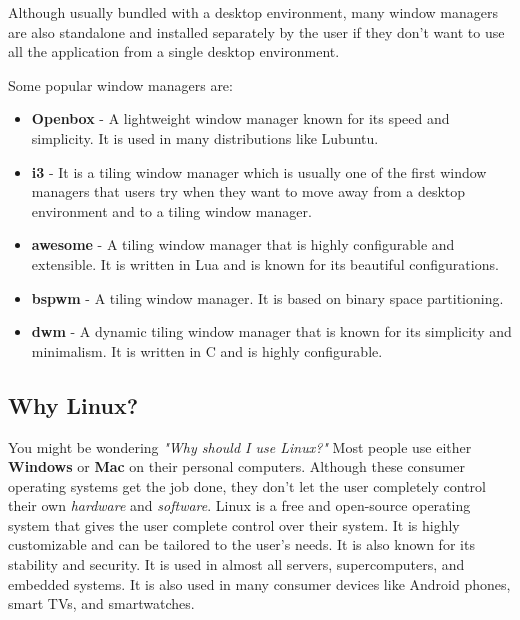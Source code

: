 Although usually bundled with a desktop environment, many window managers are also standalone and installed separately by the user if they don't want to use all the application from a single desktop environment.

Some popular window managers are:

\begin{itemize}
  \item
    \textbf{Openbox} - A lightweight window manager known for its speed and simplicity. It is used in many distributions like Lubuntu.
  \item
    \textbf{i3} - It is a tiling window manager
    which is usually one of the first window managers that users try when they want to move away from a desktop environment and to a tiling window manager.
  \item \textbf{awesome} - A tiling window manager that is highly configurable and extensible. It is written in Lua and is known for its beautiful configurations.
  \item \textbf{bspwm} - A tiling window manager. It is based on binary space partitioning.
  \item \textbf{dwm} - A dynamic tiling window manager that is known for its simplicity and minimalism. It is written in C and is highly configurable.
  \end{itemize}

\subsection{Why Linux?}

You might be wondering
\textit{
  "Why should I use Linux?"
}
Most people use either \textbf{Windows} or \textbf{Mac} on their personal computers. Although these consumer operating systems get the job done, they don't let the user completely control their own \textit{hardware} and \textit{software}.
Linux
is a free and open-source operating system that gives the user complete control over their system. It is highly customizable and can be tailored to the user's needs. It is also known for its stability and security. It is used in almost all servers, supercomputers, and embedded systems. It is also used in many consumer devices like Android phones, smart TVs, and smartwatches.

